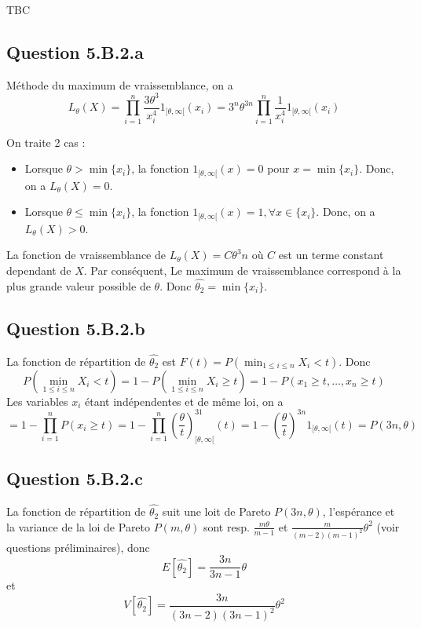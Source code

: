 \documentclass[]{book}
\theoremstyle{definition}
\begin{document}
TBC

\subsection*{Question 5.B.2.a}
M\'ethode du maximum de vraissemblance, on a 
$$
L_{\theta}(X) = \prod_{i=1}^{n}{\frac{3\theta^3}{x_i^{4}}1_{[\theta, \infty[}(x_i)} = 3^{n}\theta^{3n}\prod_{i=1}^{n}{\frac{1}{x_i^4}1_{[\theta, \infty[}(x_i)}
$$

On traite 2 cas :
\begin{itemize}
\item Lorsque $\theta > \min\{x_i\}$, la fonction $1_{[\theta, \infty[}(x) = 0$ pour $x = \min\{x_i\}$. Donc, on a $L_{\theta}(X) = 0$.   
\item Lorsque $\theta \leq \min\{x_i\}$, la fonction $1_{[\theta, \infty[}(x) = 1, \forall x \in \{x_i\}$. Donc, on a $L_{\theta}(X) > 0$.
\end{itemize}
La fonction de vraissemblance de $L_{\theta}(X) = C \theta^3n$ o\`u $C$ est un terme constant dependant de $X$. Par cons\'equent, Le maximum de vraissemblance correspond \`a la plus grande valeur possible de $\theta$. Donc $\hat{\theta_2} = \min\{x_i\}$.


\subsection*{Question 5.B.2.b}
La fonction de r\'epartition de $\hat{\theta_2}$ est $F(t) = P(\min_{1 \leq i \leq n} X_i <t)$. Donc
$$
P(\min_{1 \leq i \leq n} X_i <t) = 1 - P(\min_{1 \leq i \leq n} X_i \geq t) = 1 - P(x_1 \geq t, \ldots, x_n \geq t) 
$$
Les variables $x_i$ \'etant ind\'ependentes et de m\^eme loi, on a 
$$
= 1 - \prod_{i=1}^{n}{P(x_i \geq t)} 
= 1 - \prod_{i=1}^{n}{\left(\frac{\theta}{t}\right)^31_{[\theta, \infty[}(t)}
= 1 - \left(\frac{\theta}{t}\right)^{3n}1_{[\theta, \infty[}(t) = P(3n, \theta)
$$

\subsection*{Question 5.B.2.c}
La fonction de r\'epartition de $\hat{\theta_2}$ suit une loit de Pareto $P(3n, \theta)$, l'esp\'erance et la variance de la loi de Pareto $P(m, \theta)$ sont resp. $\frac{m\theta}{m-1}$ et $\frac{m}{(m-2)(m-1)^2}\theta^2$ (voir questions pr\'eliminaires), donc
$$
E[\hat{\theta_2}] = \frac{3n}{3n-1}\theta
$$ 
et 
$$
V[\hat{\theta_2}] = \frac{3n}{(3n-2)(3n-1)^2}\theta^2
$$
\end{document}
